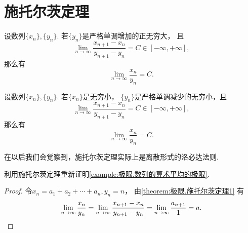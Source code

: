 \section{施托尔茨定理}
\begin{theorem}[施托尔茨定理I]\label{theorem:极限.施托尔茨定理1}
设数列\(\{x_n\},\{y_n\}\).
若\(\{y_n\}\)是严格单调增加的正无穷大，
且\[
	\lim_{n\to\infty} \frac{x_{n+1}-x_n}{y_{n+1}-y_n}
	= C
	\in[-\infty,+\infty],
\]
那么有\[
	\lim_{n\to\infty} \frac{x_n}{y_n}
	= C.
\]
\end{theorem}

\begin{theorem}[施托尔茨定理II]\label{theorem:极限.施托尔茨定理2}
设数列\(\{x_n\},\{y_n\}\).
若\(\{x_n\}\)是无穷小，
\(\{y_n\}\)是严格单调减少的无穷小，且\[
	\lim_{n\to\infty} \frac{x_{n+1}-x_n}{y_{n+1}-y_n}
	= C
	\in[-\infty,+\infty],
\]
那么有\[
	\lim_{n\to\infty} \frac{x_n}{y_n}
	= C.
\]
\end{theorem}

\begin{remark}
在以后我们会觉察到，施托尔茨定理实际上是离散形式的洛必达法则.
\end{remark}

\begin{example}
利用施托尔茨定理重新证明\cref{example:极限.数列的算术平均的极限}.
\begin{proof}
令\(x_n=a_1+a_2+\dotsb+a_n,y_n=n\)，
由\cref{theorem:极限.施托尔茨定理1} 有\[
	\lim_{n\to\infty} \frac{x_n}{y_n}
	= \lim_{n\to\infty} \frac{x_{n+1}-x_n}{y_{n+1}-y_n}
	= \lim_{n\to\infty} \frac{a_{n+1}}{1}
	= a.
	\qedhere
\]
\end{proof}
\end{example}


